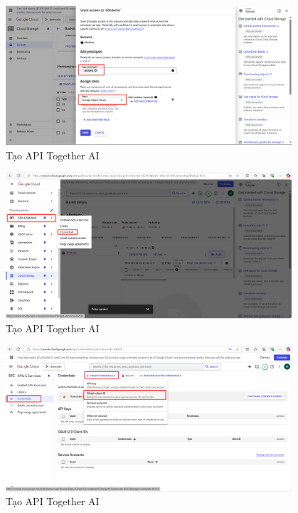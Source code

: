 \begin{itemize}[label=]
\begin{figure}[H]
    \end{figure}
    \begin{figure}[H]
    \centering
    \includegraphics[width=0.95\textwidth]{images/GGcloud-9.png}
    \caption{Tạo API Together AI}
    
    \end{figure}
    \begin{figure}[H]
    \centering
    \includegraphics[width=0.95\textwidth]{images/GGcloud-10.png}
    \caption{Tạo API Together AI}
    
    \end{figure}
        \begin{figure}[H]
    \centering
    \includegraphics[width=0.95\textwidth]{images/GGcloud-11.png}
    \caption{Tạo API Together AI}
    

\end{figure}
\end{itemize}
